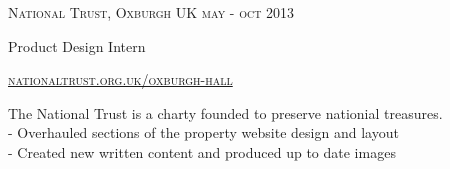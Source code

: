 {
    \textsc{\small{National Trust, Oxburgh UK
        \hfill
        {\raggedleft
            may - oct 2013
        } \\
        }
    }
    {\raggedright\large {
        Product Design Intern
    } \\}

    \textsc{\small\href{http://www.nationaltrust.org.uk/oxburgh-hall}{nationaltrust.org.uk/oxburgh-hall}}

    \normalsize{
        The National Trust is a charty founded to preserve nationial treasures.\\
        - Overhauled sections of the property website design and layout \\
        - Created new written content and produced up to date images
    }
}
